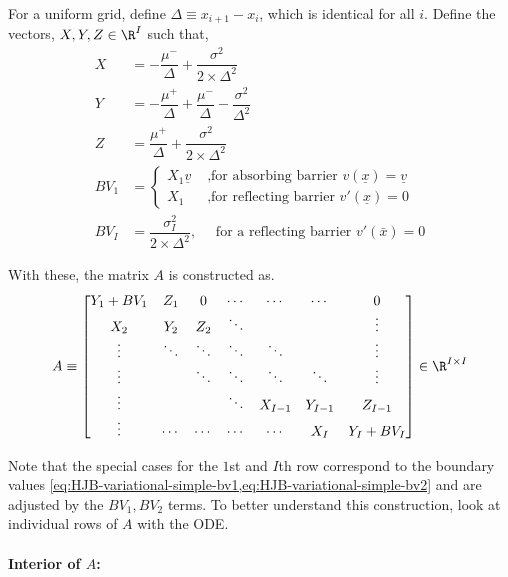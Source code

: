 \documentclass[11pt]{etk-article}
\begin{document}
For a uniform grid, define $\Delta \equiv x_{i+1} - x_i$, which is identical for all $i$.  Define the vectors, $X,Y,Z \in \R^I$ such that,
\begin{align}
	X &= - \dfrac{\mu^{-}}{\Delta} + \dfrac{\sigma^{2}}{2\times \Delta^{2}} \\
	Y &= - \dfrac{\mu^{+}}{\Delta} + \dfrac{\mu^{-}}{\Delta} - \dfrac{\sigma^{2}}{\Delta^{2}} \\
	Z &= \dfrac{\mu^{+}}{\Delta} + \dfrac{\sigma^{2}}{2\times \Delta^{2}}\\
	BV_1 &= \begin{cases} X_1 \underline{v} & \text{ ,for absorbing barrier $v(\underline{x}) = \underline{v}$}\\
	X_1& \text{ ,for reflecting barrier $v'(\underline{x}) = 0$}\end{cases}\\
	BV_I &= \dfrac{\sigma_I^2}{2\times\Delta^2}, \quad \text{ for a reflecting barrier $v'(\bar{x}) = 0$}
\end{align}


With these, the matrix $A$ is constructed as.
\begin{equation}
A \equiv \begin{bmatrix}
Y_1 + BV_1 & Z_1 & 0 & \cdots & \cdots & \cdots & 0 \\
X_2 & Y_2 & Z_2 & \ddots & & & \vdots \\
\vdots & \ddots & \ddots & \ddots & \ddots &  & \vdots \\
\vdots & &\ddots & \ddots & \ddots & \ddots  & \vdots \\
\vdots & & & \ddots & X_{I-1} & Y_{I-1}  & Z_{I-1} \\
\vdots & \cdots & \cdots & \cdots & \cdots & X_I & Y_I+BV_I\\
\end{bmatrix}\in\R^{I\times I}\label{eq:A}
\end{equation}

Note that the special cases for the $1$st and $I$th row correspond to the boundary values \cref{eq:HJB-variational-simple-bv1,eq:HJB-variational-simple-bv2} and are adjusted by the $BV_1,BV_2$ terms. To better understand this construction, look at individual rows of $A$ with the ODE.

\paragraph{Interior of $A$:}
\end{document}
